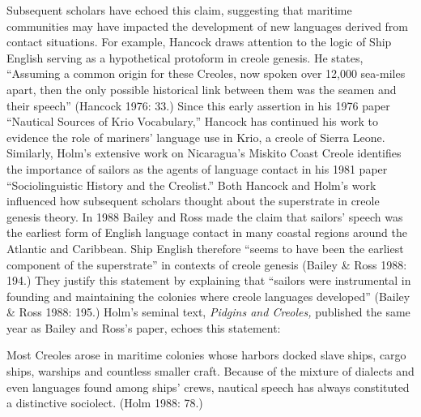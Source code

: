 \begin{styleStandard}
Subsequent scholars have echoed this claim, suggesting that maritime communities may have impacted the development of new languages derived from contact situations. For example, Hancock draws attention to the logic of Ship English serving as a hypothetical protoform in creole genesis. He states, “Assuming a common origin for these Creoles, now spoken over 12,000 sea-miles apart, then the only possible historical link between them was the seamen and their speech” (Hancock 1976: 33.) Since this early assertion in his 1976 paper “Nautical Sources of Krio Vocabulary,” Hancock has continued his work to evidence the role of mariners’ language use in Krio, a creole of Sierra Leone. Similarly, Holm’s extensive work on Nicaragua’s Miskito Coast Creole identifies the importance of sailors as the agents of language contact in his 1981 paper “Sociolinguistic History and the Creolist.” Both Hancock and Holm’s work influenced how subsequent scholars thought about the superstrate in creole genesis theory. In 1988 Bailey and Ross made the claim that sailors’ speech\textbf{ }was the earliest form of English language contact in many coastal regions around the Atlantic and Caribbean. Ship English therefore “seems to have been the earliest component of the superstrate” in contexts of creole genesis (Bailey \& Ross 1988: 194.) They justify this statement by explaining that “sailors were instrumental in founding and maintaining the colonies where creole languages developed” (Bailey \& Ross 1988: 195.) Holm’s seminal text, \textit{Pidgins and Creoles, }published the same year as Bailey and Ross’s paper, echoes this statement: 
\end{styleStandard}

\begin{styleStandard}
Most Creoles arose in maritime colonies whose harbors docked slave ships, cargo ships, warships and countless smaller craft. Because of the mixture of dialects and even languages found among ships' crews, nautical speech has always constituted a distinctive sociolect. (Holm 1988: 78.) 
\end{styleStandard}

